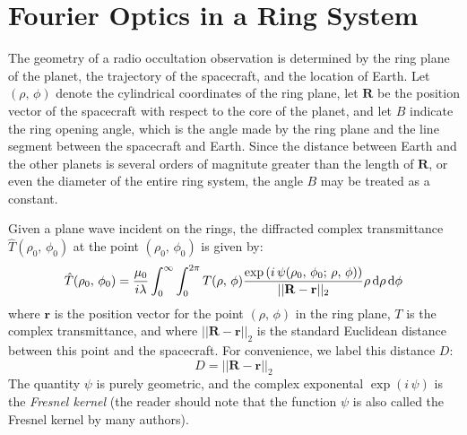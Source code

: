 \documentclass{article}
\theoremstyle{plain}
\begin{document}
    \section{Fourier Optics in a Ring System}
        The geometry of a radio occultation observation is determined by the
        ring plane of the planet, the trajectory of the spacecraft, and the
        location of Earth. Let $(\rho,\,\phi)$ denote the cylindrical
        coordinates of the ring plane, let $\mathbf{R}$ be the position
        vector of the spacecraft with respect to the core of the planet, and
        let $B$ indicate the ring opening angle, which is the angle made
        by the ring plane and the line segment between the spacecraft and
        Earth. Since the distance between Earth and the other planets is
        several orders of magnitute greater than the length of $\mathbf{R}$,
        or even the diameter of the entire ring system, the angle $B$ may be
        treated as a constant.
        \par\hfill\par
        Given a plane wave incident on the rings, the diffracted complex
        transmittance $\hat{T}(\rho_{0},\,\phi_{0})$ at the point
        $(\rho_{0},\,\phi_{0})$ is given by:
        \begin{equation}
            \label{eqn:huygens_principal}
            \hat{T}(\rho_{0},\,\phi_{0})
            =\frac{\mu_{0}}{i\lambda}\int_{0}^{\infty}\int_{0}^{2\pi}
                T(\rho,\,\phi)
                \frac{%
                    \exp\left(
                        i\,\psi(\rho_{0},\,\phi_{0};\,\rho,\,\phi)
                    \right)
                }{%
                    ||\mathbf{R}-\mathbf{r}||_{2}
                }
                \rho\,\textrm{d}\rho\,\textrm{d}\phi
        \end{equation}
        where $\mathbf{r}$ is the position vector for the point
        $(\rho,\,\phi)$ in the ring plane, $T$ is the complex transmittance,
        and where $||\mathbf{R}-\mathbf{r}||_{2}$ is the standard
        Euclidean distance between this point and the spacecraft.
        For convenience, we label this distance $D$:
        \begin{equation}
            D=||\mathbf{R}-\mathbf{r}||_{2}
        \end{equation}
        The quantity $\psi$ is purely geometric, and the complex
        exponental $\exp(i\,\psi)$ is the \textit{Fresnel kernel} (the
        reader should note that the function $\psi$ is also called the Fresnel
        kernel by many authors).
\end{document}
